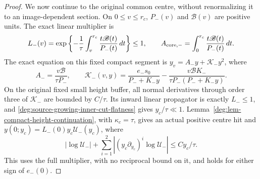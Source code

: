 \begin{proof}
We now continue to the original common centre, without
renormalizing it to an image-dependent section.
On \(0\le v\le r_c\), \(P_-(v)\) and \(\mathscr B(v)\)
are positive units.  The exact linear multiplier is
\begin{equation}
 L_-(v)=\exp\left\{-\frac1\tau
               \int_v^{r_c}\frac{t\mathscr B(t)}{P_-(t)}\,dt
                  \right\}\le1,\qquad
 A_{\rm core,-}=\int_0^{r_c}\frac{t\mathscr B(t)}{P_-(t)}\,dt.
 \label{deg:source-growing-negative-core-linear-factor}
\end{equation}
The exact equation on this fixed compact segment is
\(y_v=A_-y+\mathcal K_-y^2\), where
\begin{equation}
 A_- =\frac{v\mathscr B}{\tau P_-},\qquad
 \mathcal K_-(v,y)=\frac{e_-s_0}{P_-+K_-y}
       -\frac{v\mathscr B K_-}{\tau P_-(P_-+K_-y)} .
 \label{deg:source-growing-negative-core-equation}
\end{equation}
On the original fixed small height buffer, all normal derivatives
through order three of \(\mathcal K_-\) are bounded by \(C/\tau\).
Its inward linear propagator is exactly \(L_-\le1\), and
\eqref{deg:source-growing-inner-cut-flatness} gives \(y_c/\tau\ll1\).
Lemma~\ref{deg:lem-compact-height-continuation}, with
\(\kappa_c=\tau\), gives
an actual positive centre hit and
\(y(0;y_c)=L_-(0)y_c\mathcal U_-(y_c)\), where
\begin{equation}
 |\log\mathcal U_-|+
 \sum_{i=1}^2|(y_c\partial_{y_c})^i\log\mathcal U_-|
                                  \le Cy_c/\tau .
 \label{deg:source-growing-negative-core-height-rows}
\end{equation}
This uses the full multiplier, with no reciprocal bound on it, and
holds for either sign of \(e_-(0)\).


\end{proof}
